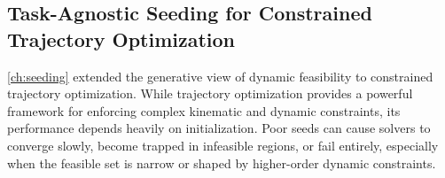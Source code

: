 



\subsection{Task-Agnostic Seeding for Constrained Trajectory Optimization}
\label{sec:discussion:seeding}

\cref{ch:seeding} extended the generative view of dynamic feasibility to constrained trajectory optimization.
While trajectory optimization provides a powerful framework for enforcing complex kinematic and dynamic constraints, its performance depends heavily on initialization.
Poor seeds can cause solvers to converge slowly, become trapped in infeasible regions, or fail entirely, especially when the feasible set is narrow or shaped by higher-order dynamic constraints.

